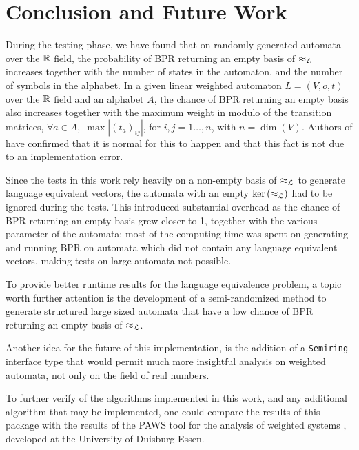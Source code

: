 \section{Conclusion and Future Work}


During the testing phase, we have found that on randomly generated automata 
over the $\mathbb{R}$ field, the probability of BPR returning an empty basis of $\approx_{\mathcal{L}}$
increases together with the number of states in the automaton, and the number of
 symbols in the alphabet.
In a given linear weighted automaton $L = (V, o,t )$
over the $\mathbb{R}$ field and an alphabet $A$, the chance of BPR returning an empty basis also
increases together with the maximum weight in modulo of the transition matrices,
$\forall a \in A, \; \max |(t_a)_{ij}|$, for $i,j=1\hdots,n$, with 
$n = \dim(V)$. Authors of \cite{BONCHI201277} have confirmed
that it is normal for this to happen and that this fact is not due
to an implementation error.

Since the tests in this work rely heavily on a non-empty basis of $\approx_{\mathcal{L}}$ to generate
language equivalent vectors, the automata with an empty $\text{ker}\left(\approx_{\mathcal{L}}\right)$ had to be ignored during the 
tests. This introduced substantial overhead as the chance of BPR returning an empty basis 
grew closer to 1, together with the various parameter of the automata: 
most of the computing time was spent on generating and running BPR on automata which did
not contain any language equivalent vectors, making tests on large automata not possible.

To provide better runtime results for the language equivalence problem, 
a topic worth further attention is the development of a semi-randomized method to 
generate structured large sized automata that have a low chance of BPR
returning an empty basis of $\approx_{\mathcal{L}}$.


Another idea for the future of this implementation, is the addition
of a \texttt{Semiring} interface type that would permit much more insightful analysis
on weighted automata, not only on the field of real numbers.  

To further verify of the algorithms implemented in this work, 
and any additional algorithm that may be implemented, 
one could compare the results of this package with the results 
of the PAWS tool for the analysis of weighted systems \cite{konig2017paws}, developed 
at the University of Duisburg-Essen.
